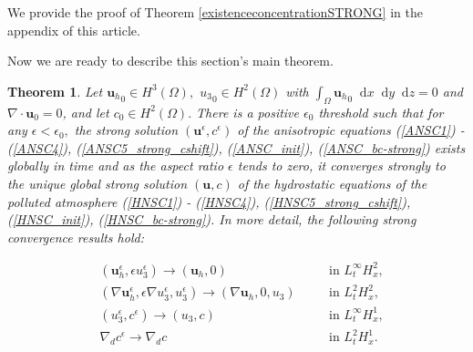\documentclass[11pt]{article}
\newtheorem{theorem}{Theorem}
\newcommand*\diff{\mathop{}\!\mathrm{d}}
\begin{document}
We provide the proof of Theorem \ref{existenceconcentrationSTRONG} in the appendix of this article.

Now we are ready to describe this section's main theorem.

\begin{theorem} \label{maintheoremSTRONG}
Let ${\mathbf{u}_h}_0 \in H^3(\Omega),$ ${u_3}_0 \in H^2(\Omega)$ with $\int_\Omega {\mathbf{u}_h}_0 \diff x \diff y \diff z = 0$ and $\nabla \cdot \mathbf{u}_0 = 0$, and let $c_0 \in H^2 (\Omega).$ There is a positive $\epsilon_0$ threshold such that for any $\epsilon < \epsilon_0,$ the strong solution $(\mathbf{u}^\epsilon, c^\epsilon)$ of the anisotropic equations (\ref{ANSC1}) - (\ref{ANSC4}), (\ref{ANSC5_strong_cshift}), (\ref{ANSC_init}), (\ref{ANSC_bc-strong}) exists globally in time and as the aspect ratio $\epsilon$ tends to zero, it converges strongly to the unique global strong solution $(\mathbf{u}, c)$ of the hydrostatic equations of the polluted atmosphere (\ref{HNSC1}) - (\ref{HNSC4}), (\ref{HNSC5_strong_cshift}), (\ref{HNSC_init}), (\ref{HNSC_bc-strong}). In more detail, the following strong convergence results hold:

\begin{align} 
& (\mathbf{u}_h^\epsilon, \epsilon u_3^\epsilon) \to (\mathbf{u}_h, 0) &\quad & \text{in $L_t^\infty H_x^2$,} \label{StrongConvVelocity1statement} \\
& (\nabla \mathbf{u}_h^\epsilon, \epsilon \nabla u_3^\epsilon, u_3^\epsilon) \to (\nabla \mathbf{u}_h, 0, u_3) &\quad & \text{in $L_t^2 H_x^2$,} \label{StrongConvVelocity2statement} \\ 
& (u_3^\epsilon, c^\epsilon) \to (u_3, c) &\quad & \text{in $L_t^\infty H_x^1,$} \label{StrongConvVelocity3andConcentrationstatement} \\
& \nabla_d c^\epsilon \to \nabla_d c &\quad & \text{in $L_t^2 H_x^1.$} \label{StrongConvConcentrationstatement}
\end{align}

\end{theorem}
\end{document}
